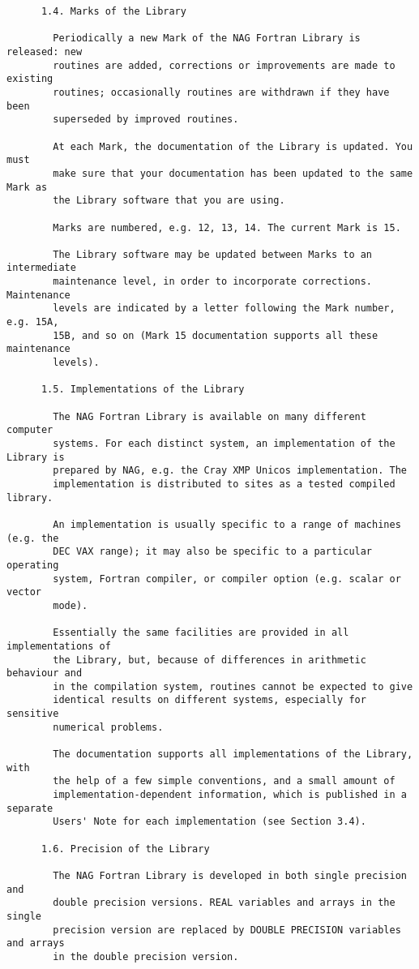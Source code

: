 \begin{small}
\begin{verbatim}
      1.4. Marks of the Library

        Periodically a new Mark of the NAG Fortran Library is released: new
        routines are added, corrections or improvements are made to existing
        routines; occasionally routines are withdrawn if they have been
        superseded by improved routines.

        At each Mark, the documentation of the Library is updated. You must
        make sure that your documentation has been updated to the same Mark as
        the Library software that you are using.

        Marks are numbered, e.g. 12, 13, 14. The current Mark is 15.

        The Library software may be updated between Marks to an intermediate
        maintenance level, in order to incorporate corrections. Maintenance
        levels are indicated by a letter following the Mark number, e.g. 15A,
        15B, and so on (Mark 15 documentation supports all these maintenance
        levels).

      1.5. Implementations of the Library

        The NAG Fortran Library is available on many different computer
        systems. For each distinct system, an implementation of the Library is
        prepared by NAG, e.g. the Cray XMP Unicos implementation. The
        implementation is distributed to sites as a tested compiled library.

        An implementation is usually specific to a range of machines (e.g. the
        DEC VAX range); it may also be specific to a particular operating
        system, Fortran compiler, or compiler option (e.g. scalar or vector
        mode).

        Essentially the same facilities are provided in all implementations of
        the Library, but, because of differences in arithmetic behaviour and
        in the compilation system, routines cannot be expected to give
        identical results on different systems, especially for sensitive
        numerical problems.

        The documentation supports all implementations of the Library, with
        the help of a few simple conventions, and a small amount of
        implementation-dependent information, which is published in a separate
        Users' Note for each implementation (see Section 3.4).

      1.6. Precision of the Library

        The NAG Fortran Library is developed in both single precision and
        double precision versions. REAL variables and arrays in the single
        precision version are replaced by DOUBLE PRECISION variables and arrays
        in the double precision version.


\end{verbatim}
\end{small}
